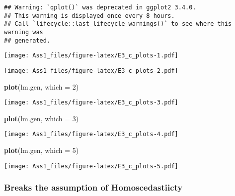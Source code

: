 \documentclass[
]{article}
\newenvironment{Shaded}{\begin{snugshade}}{\end{snugshade}}
\newcommand{\AttributeTok}[1]{\textcolor[rgb]{0.13,0.29,0.53}{#1}}
\newcommand{\DecValTok}[1]{\textcolor[rgb]{0.00,0.00,0.81}{#1}}
\newcommand{\FunctionTok}[1]{\textcolor[rgb]{0.13,0.29,0.53}{\textbf{#1}}}
\newcommand{\NormalTok}[1]{#1}
\newcommand{\OtherTok}[1]{\textcolor[rgb]{0.56,0.35,0.01}{#1}}
\newcommand{\SpecialCharTok}[1]{\textcolor[rgb]{0.81,0.36,0.00}{\textbf{#1}}}
\begin{document}
\begin{verbatim}
## Warning: `qplot()` was deprecated in ggplot2 3.4.0.
## This warning is displayed once every 8 hours.
## Call `lifecycle::last_lifecycle_warnings()` to see where this warning was
## generated.
\end{verbatim}

\texttt{[image: Ass1\_files/figure-latex/E3\_c\_plots-1.pdf]}

\begin{Shaded}
\end{Shaded}

\texttt{[image: Ass1\_files/figure-latex/E3\_c\_plots-2.pdf]}

\begin{Shaded}
\begin{Highlighting}[]
\FunctionTok{plot}\NormalTok{(lm.gen, }\AttributeTok{which =} \DecValTok{2}\NormalTok{)}
\end{Highlighting}
\end{Shaded}

\texttt{[image: Ass1\_files/figure-latex/E3\_c\_plots-3.pdf]}

\begin{Shaded}
\begin{Highlighting}[]
\FunctionTok{plot}\NormalTok{(lm.gen, }\AttributeTok{which =} \DecValTok{3}\NormalTok{)}
\end{Highlighting}
\end{Shaded}

\texttt{[image: Ass1\_files/figure-latex/E3\_c\_plots-4.pdf]}

\begin{Shaded}
\begin{Highlighting}[]
\FunctionTok{plot}\NormalTok{(lm.gen, }\AttributeTok{which =} \DecValTok{5}\NormalTok{)}
\end{Highlighting}
\end{Shaded}

\texttt{[image: Ass1\_files/figure-latex/E3\_c\_plots-5.pdf]}

\subsubsection{Breaks the assumption of
Homoscedastiicty}\label{breaks-the-assumption-of-homoscedastiicty}
\end{document}
